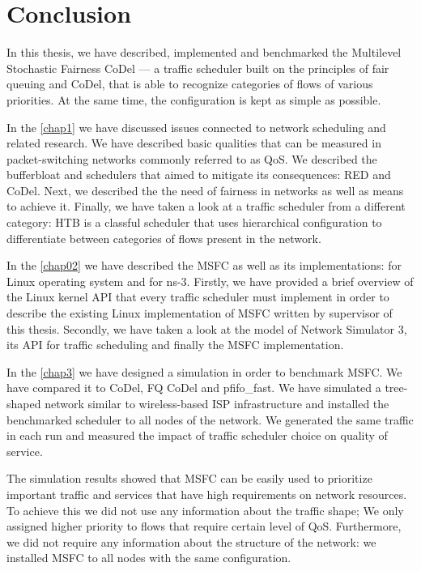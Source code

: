 \chapter*{Conclusion}

In this thesis, we have described, implemented and benchmarked the Multilevel Stochastic Fairness CoDel --- a traffic scheduler built on the principles of fair queuing and CoDel, that is able to recognize categories of flows of various priorities. At the same time, the configuration is kept as simple as possible. 

In the \autoref{chap1} we have discussed issues connected to network scheduling and related research. We have described basic qualities that can be measured in packet-switching networks commonly referred to as QoS. We described the bufferbloat and schedulers that aimed to mitigate its consequences: RED and CoDel. Next, we described the the need of fairness in networks as well as means to achieve it. Finally, we have taken a look at a traffic scheduler from a different category: HTB is a classful scheduler that uses hierarchical configuration to differentiate between categories of flows present in the network.

In the \autoref{chap02} we have described the MSFC as well as its implementations: for Linux operating system and for ns-3. Firstly, we have provided a brief overview of the Linux kernel API that every traffic scheduler must implement in order to describe the existing Linux implementation of MSFC written by supervisor of this thesis. Secondly, we have taken a look at the model of Network Simulator 3, its API for traffic scheduling and finally the MSFC implementation.

In the \autoref{chap3} we have designed a simulation in order to benchmark MSFC. We have compared it to CoDel, FQ CoDel and pfifo\_fast. We have simulated a tree-shaped network similar to wireless-based ISP infrastructure and installed the benchmarked scheduler to all nodes of the network. We generated the same traffic in each run and measured the impact of traffic scheduler choice on quality of service.

The simulation results showed that MSFC can be easily used to prioritize important traffic and services that have high requirements on network resources. To achieve this we did not use any information about the traffic shape; We only assigned higher priority to flows that require certain level of QoS. Furthermore, we did not require any information about the structure of the network: we installed MSFC to all nodes with the same configuration.

